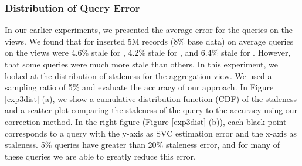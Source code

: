 \subsubsection{Distribution of Query Error} In our earlier experiments, we presented the average error for the queries on the views.
We found that for inserted 5M records (8\% base data) on average queries on the views were 4.6\% stale for \spview, 4.2\% stale for \fjview, and 6.4\% stale for \aggview. 
However, that some queries were much more stale than others.
In this experiment, we looked at the distribution of staleness for the aggregation view.
We used a sampling ratio of 5\% and evaluate the accuracy of our approach. 
In Figure \ref{exp3dist} (a), we show a cumulative distribution function (CDF) of the staleness and a scatter plot comparing the staleness of the query to the accuracy using our correction method.
In the right figure (Figure \ref{exp3dist} (b)), each black point corresponds to a query with the y-axis as SVC estimation error and the x-axis as staleness. 
5\% queries have greater than 20\% staleness error, and for many of these queries we are able to greatly reduce this error.
